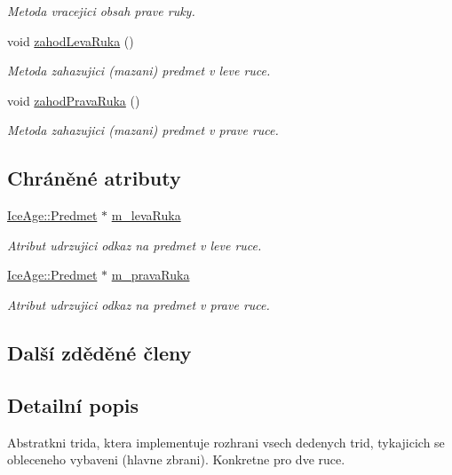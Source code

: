 \begin{DoxyCompactItemize}
\begin{DoxyCompactList}\small\item\em Metoda vracejici obsah prave ruky. \end{DoxyCompactList}\item 
void \hyperlink{classIceAge_1_1ObleceneVybaveniVeverky_ab02450c60394e0c21e08beff15971c60}{zahod\+Leva\+Ruka} ()
\begin{DoxyCompactList}\small\item\em Metoda zahazujici (mazani) predmet v leve ruce. \end{DoxyCompactList}\item 
void \hyperlink{classIceAge_1_1ObleceneVybaveniVeverky_ac24580a8bfcf97220c1967f58111c8f1}{zahod\+Prava\+Ruka} ()
\begin{DoxyCompactList}\small\item\em Metoda zahazujici (mazani) predmet v prave ruce. \end{DoxyCompactList}\end{DoxyCompactItemize}
\subsection*{Chráněné atributy}
\begin{DoxyCompactItemize}
\item 
\hyperlink{classIceAge_1_1Predmet}{Ice\+Age\+::\+Predmet} $\ast$ \hyperlink{classIceAge_1_1ObleceneVybaveniVeverky_ad4e876f5b31bad5594470ee0c3588194}{m\+\_\+leva\+Ruka}
\begin{DoxyCompactList}\small\item\em Atribut udrzujici odkaz na predmet v leve ruce. \end{DoxyCompactList}\item 
\hyperlink{classIceAge_1_1Predmet}{Ice\+Age\+::\+Predmet} $\ast$ \hyperlink{classIceAge_1_1ObleceneVybaveniVeverky_a5cbec76ba9606fa634019e10f33f605c}{m\+\_\+prava\+Ruka}
\begin{DoxyCompactList}\small\item\em Atribut udrzujici odkaz na predmet v prave ruce. \end{DoxyCompactList}\end{DoxyCompactItemize}
\subsection*{Další zděděné členy}


\subsection{Detailní popis}
Abstratkni trida, ktera implementuje rozhrani vsech dedenych trid, tykajicich se obleceneho vybaveni (hlavne zbrani). Konkretne pro dve ruce. 


